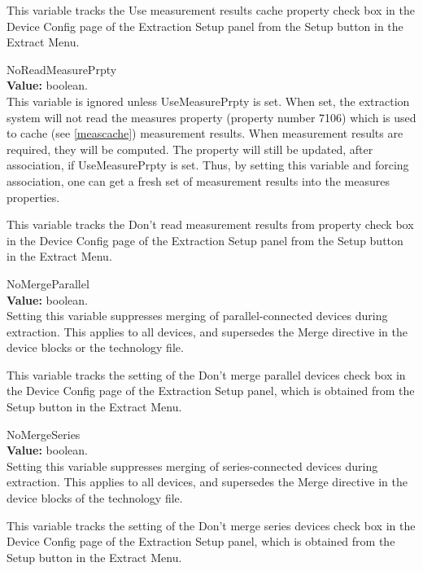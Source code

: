 \begin{description}
This variable tracks the {\cb Use measurement results cache
property} check box in the {\cb Device Config} page of the {\cb
Extraction Setup} panel from the {\cb Setup} button in the {\cb
Extract Menu}.

\item{\et NoReadMeasurePrpty}\\
{\bf Value:} boolean.\\
This variable is ignored unless {\et UseMeasurePrpty} is set.  When
set, the extraction system will not read the {\et measures} property
(property number 7106) which is used to cache (see \ref{meascache})
measurement results.  When measurement results are required, they will
be computed.  The property will still be updated, after association,
if {\et UseMeasurePrpty} is set.  Thus, by setting this variable and
forcing association, one can get a fresh set of measurement results
into the {\et measures} properties.

This variable tracks the {\cb Don't read measurement results from
property} check box in the {\cb Device Config} page of the {\cb
Extraction Setup} panel from the {\cb Setup} button in the {\cb
Extract Menu}.

\item{\et NoMergeParallel}\\
{\bf Value:} boolean.\\
Setting this variable suppresses merging of parallel-connected devices
during extraction.  This applies to all devices, and supersedes the
{\et Merge} directive in the device blocks or the technology file.

This variable tracks the setting of the {\cb Don't merge parallel
devices} check box in the {\cb Device Config} page of the {\cb
Extraction Setup} panel, which is obtained from the {\cb Setup} button
in the {\cb Extract Menu}.

\item{\et NoMergeSeries}\\
{\bf Value:} boolean.\\
Setting this variable suppresses merging of series-connected devices
during extraction.  This applies to all devices, and supersedes the
{\et Merge} directive in the device blocks of the technology file. 

This variable tracks the setting of the {\cb Don't merge series
devices} check box in the {\cb Device Config} page of the {\cb
Extraction Setup} panel, which is obtained from the {\cb Setup} button
in the {\cb Extract Menu}.


\end{description}
